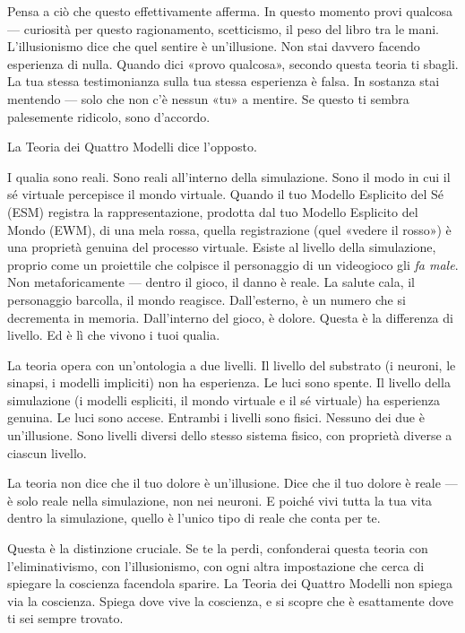 \documentclass[11pt, twoside, openright]{book}
\begin{document}
Pensa a ciò che questo effettivamente afferma. In questo momento provi qualcosa --- curiosità per questo ragionamento, scetticismo, il peso del libro tra le mani. L'illusionismo dice che quel sentire è un'illusione. Non stai davvero facendo esperienza di nulla. Quando dici «provo qualcosa», secondo questa teoria ti sbagli. La tua stessa testimonianza sulla tua stessa esperienza è falsa. In sostanza stai mentendo --- solo che non c'è nessun «tu» a mentire. Se questo ti sembra palesemente ridicolo, sono d'accordo.

La Teoria dei Quattro Modelli dice l'opposto.

I qualia sono reali. Sono reali all'interno della simulazione. Sono il modo in cui il sé virtuale percepisce il mondo virtuale. Quando il tuo Modello Esplicito del Sé (ESM) registra la rappresentazione, prodotta dal tuo Modello Esplicito del Mondo (EWM), di una mela rossa, quella registrazione (quel «vedere il rosso») è una proprietà genuina del processo virtuale. Esiste al livello della simulazione, proprio come un proiettile che colpisce il personaggio di un videogioco gli \textit{fa male}. Non metaforicamente --- dentro il gioco, il danno è reale. La salute cala, il personaggio barcolla, il mondo reagisce. Dall'esterno, è un numero che si decrementa in memoria. Dall'interno del gioco, è dolore. Questa è la differenza di livello. Ed è lì che vivono i tuoi qualia.

La teoria opera con un'ontologia a due livelli. Il livello del substrato (i neuroni, le sinapsi, i modelli impliciti) non ha esperienza. Le luci sono spente. Il livello della simulazione (i modelli espliciti, il mondo virtuale e il sé virtuale) ha esperienza genuina. Le luci sono accese. Entrambi i livelli sono fisici. Nessuno dei due è un'illusione. Sono livelli diversi dello stesso sistema fisico, con proprietà diverse a ciascun livello.

La teoria non dice che il tuo dolore è un'illusione. Dice che il tuo dolore è reale --- è solo reale nella simulazione, non nei neuroni. E poiché vivi tutta la tua vita dentro la simulazione, quello è l'unico tipo di reale che conta per te.

Questa è la distinzione cruciale. Se te la perdi, confonderai questa teoria con l'eliminativismo, con l'illusionismo, con ogni altra impostazione che cerca di spiegare la coscienza facendola sparire. La Teoria dei Quattro Modelli non spiega via la coscienza. Spiega dove vive la coscienza, e si scopre che è esattamente dove ti sei sempre trovato.
\end{document}
